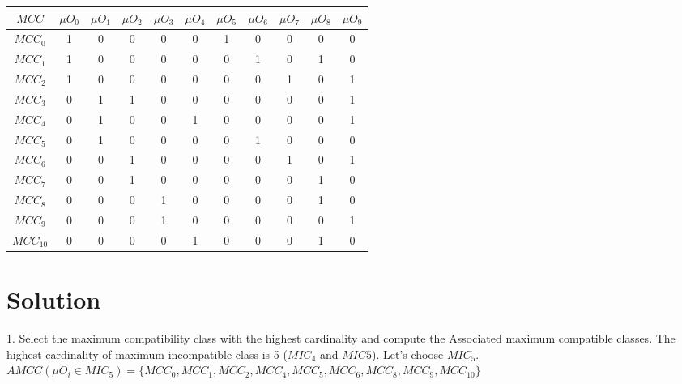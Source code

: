 \begin{table}[H]
    \centering
        \begin{tabular}{|c|c|c|c|c|c|c|c|c|c|c|}
            \hline
            $MCC$ & $\mu O_{0}$ & $\mu O_{1}$ & $\mu O_{2}$ & $\mu O_{3}$ & $\mu O_{4}$ & $\mu O_{5}$ & $\mu O_{6}$ & $\mu O_{7}$ & $\mu O_{8}$ & $\mu O_{9}$ \\ \hline
            $MCC_{0}$ & 1 & 0 & 0 & 0 & 0 & 1 & 0 & 0 & 0 & 0 \\ \hline
            $MCC_{1}$ & 1 & 0 & 0 & 0 & 0 & 0 & 1 & 0 & 1 & 0 \\ \hline
            $MCC_{2}$ & 1 & 0 & 0 & 0 & 0 & 0 & 0 & 1 & 0 & 1 \\ \hline
            $MCC_{3}$ & 0 & 1 & 1 & 0 & 0 & 0 & 0 & 0 & 0 & 1 \\ \hline
            $MCC_{4}$ & 0 & 1 & 0 & 0 & 1 & 0 & 0 & 0 & 0 & 1 \\ \hline
            $MCC_{5}$ & 0 & 1 & 0 & 0 & 0 & 0 & 1 & 0 & 0 & 0 \\ \hline
            $MCC_{6}$ & 0 & 0 & 1 & 0 & 0 & 0 & 0 & 1 & 0 & 1 \\ \hline
            $MCC_{7}$ & 0 & 0 & 1 & 0 & 0 & 0 & 0 & 0 & 1 & 0 \\ \hline
            $MCC_{8}$ & 0 & 0 & 0 & 1 & 0 & 0 & 0 & 0 & 1 & 0 \\ \hline
            $MCC_{9}$ & 0 & 0 & 0 & 1 & 0 & 0 & 0 & 0 & 0 & 1 \\ \hline
            $MCC_{10}$ & 0 & 0 & 0 & 0 & 1 & 0 & 0 & 0 & 1 & 0 \\ \hline
        \end{tabular}
\end{table}

\section*{Solution}

1. Select the maximum compatibility class with the highest cardinality and compute the Associated maximum compatible classes.
The highest cardinality of maximum incompatible class is 5 ($MIC_{4}$ and $MIC{5}$).
Let's choose $MIC_{5}$.
    $AMCC(\mu O_{i} \in MIC_{5}) = \{ MCC_{0}, MCC_{1}, MCC_{2}, MCC_{4}, MCC_{5}, MCC_{6}, MCC_{8}, MCC_{9}, MCC_{10}\}$
    
